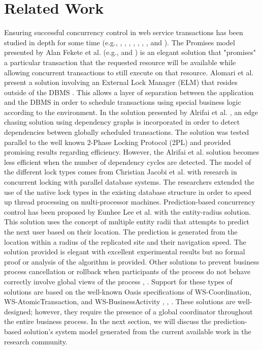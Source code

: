 \section{Related Work}
\label{pbs:related_work}

Ensuring successful concurrency control in web service transactions has been studied in depth for some time (e.g., \cite{Fekete_Promises}, \cite{Fekete_IsolationSupport}, \cite{Alrifai_Distributed_Managment}, \cite{dai_qos-driven_2009}, \cite{zhengdong_gao_combining_2005}, \cite{ferreira_transactional_2012}, \cite{kang-woo_lee_consistency_2000}, and \cite{olmsted_long_2015}). The Promises model presented by Alan Fekete et al. (e.g., \cite{Fekete_Promises} and \cite{Fekete_IsolationSupport}) is an elegant solution that "promises" a particular transaction that the requested resource will be available while allowing concurrent transactions to still execute on that resource. Alomari et al. present a solution involving an External Lock Manager (\ac{ELM}) that resides outside of the \ac{DBMS} \cite{Fekete_SnapshotIso}. This allows a layer of separation between the application and the \ac{DBMS} in order to schedule transactions using special business logic according to the environment. In the solution presented by Alrifai et al. \cite{Alrifai_Distributed_Managment}, an edge chasing solution using dependency graphs is incorporated in order to detect dependencies between globally scheduled transactions. The solution was tested parallel to the well known 2-Phase Locking Protocol (\ac{2PL}) and provided promising results regarding efficiency. However, the Alrifai et al. solution becomes less efficient when the number of dependency cycles are detected. The model of the different lock types comes from Christian Jacobi et al. \cite{Jacobi_Locking} with research in concurrent locking with parallel database systems. The researchers extended the use of the native lock types in the existing database structure in order to speed up thread processing on multi-processor machines. Prediction-based concurrency control has been proposed by Eunhee Lee et al. \cite{Eunhee_PredictionBasedCC} with the entity-radius solution. This solution uses the concept of multiple entity radii that attempts to predict the next user based on their location. The prediction is generated from the location within a radius of the replicated site and their navigation speed. The solution provided is elegant with excellent experimental results but no formal proof or analysis of the algorithm is provided. Other solutions to prevent business process cancellation or rollback when participants of the process do not behave correctly involve global views of the process \cite{Fekete_RAMP}, \cite{Riegen_RuleBased}. Support for these types of solutions are based on the well-known Oasis specifications of WS-Coordination, WS-AtomicTransaction, and WS-BusinessActivity \cite{WSCO}, \cite{WSAT}, \cite{WSBA}. These solutions are well-designed; however, they require the presence of a global coordinator throughout the entire business process. In the next section, we will discuss the prediction-based solution's system model generated from the current available work in the research community.
